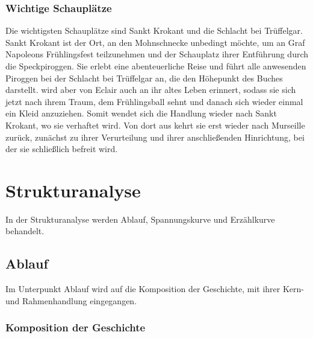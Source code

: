 \subsubsection{Wichtige Schauplätze}

Die wichtigsten Schauplätze sind Sankt Krokant und die Schlacht bei Trüffelgar.
Sankt Krokant ist der Ort, an den Mohnschnecke unbedingt möchte, um an Graf Napoleons Frühlingsfest teilzunehmen\cite[S.17]{pir} und der Schauplatz ihrer Entführung durch die Speckpiroggen.\cite[S.30ff]{pir} Sie erlebt eine abenteuerliche Reise und führt alle anwesenden Piroggen bei der Schlacht bei Trüffelgar an, \cite[S.404ff]{pir} die den Höhepunkt des Buches darstellt. wird aber von Eclair auch an ihr altes Leben erinnert, \cite[S.462]{pir} sodass sie sich jetzt nach ihrem Traum, dem Frühlingsball sehnt und danach sich wieder einmal ein Kleid anzuziehen.\cite[S.520f]{pir} Somit wendet sich die Handlung wieder nach Sankt Krokant, wo sie verhaftet wird.\cite[S.550f]{pir} Von dort aus kehrt sie erst wieder nach Murseille zurück, zunächst zu ihrer Verurteilung\cite[S.569ff]{pir} und ihrer anschließenden Hinrichtung,\cite[S.607ff]{pir} bei der sie schließlich befreit wird.\cite[S.614ff]{pir}
	
\section{Strukturanalyse}
In der Strukturanalyse werden Ablauf, Spannungskurve und Erzählkurve behandelt.

\subsection{Ablauf}
Im Unterpunkt Ablauf wird auf die Komposition der Geschichte, mit ihrer Kern- und Rahmenhandlung eingegangen.

\subsubsection{Komposition der Geschichte}

